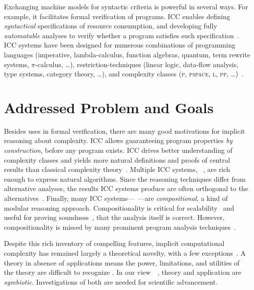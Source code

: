 Exchanging machine models for syntactic criteria is powerful in several ways.
For example, it facilitates formal verification of programs.
ICC enables defining \emph{syntactical} specifications of resource consumption, and developing fully \emph{automatable} analyses to verify whether a program satisfies such specification~\cite{heraud2011}.
ICC systems have been designed for numerous combinations of programming languages (imperative,  lambda-calculus, function algebras, quantum, term rewrite systems, \(\pi\)-calculus, \ldots), restriction-techniques (linear logic, data-flow analysis, type systems, category theory, \ldots), and complexity classes (\textsc{p}, \textsc{pspace}, \textsc{l}, \textsc{pp}, \ldots)~\cite{moyen2017,pchoux2020}.

\section{Addressed Problem and Goals}
\label{sec:aicc-goals}

Besides uses in formal verification, there are many good motivations for implicit reasoning about complexity.
ICC allows guaranteeing program properties \emph{by construction}, before any program exists.
ICC drives better understanding of complexity classes and yields more natural definitions and proofs of central results than classical complexity theory~\cite{kristiansen2017}.
Multiple ICC systems, \eg~\cite{jones2009,marion2011}, are rich enough to express {natural} algorithms.
Since the reasoning techniques differ from alternative analyses, the results ICC systems produce are often orthogonal to the alternatives~\cite{aubert20222}.
Finally, many ICC systems---\eg~\cite{jones2009,marion2011,hainry2023,atkey2024}---are \emph{compositional}, a kind of modular reasoning approach.
Compositionality is critical for scalability~\cite{carbonneaux2015} and useful for proving soundness~\cite{keidel2021}, \ie that the analysis itself is correct.
However, compositionality is missed by many prominent program analysis techniques~\cite{carbonneaux2015,schiebel2024}.

Despite this rich inventory of compelling features, implicit computational complexity has remained largely a theoretical novelty, with a few exceptions~\cite{avanzini2017,avanzini2008,moyen20172,hainry2021,hoffmann2012,feree2018}.
A theory in absence of applications means the power, limitations, and utilities of the theory are difficult to recognize%
.
In our view~\cite[pg. xxxv]{bishop2003}~\cite[p. 75]{moyen2017}, theory and application are \emph{symbiotic}.
Investigations of both are needed for scientific advancement.

